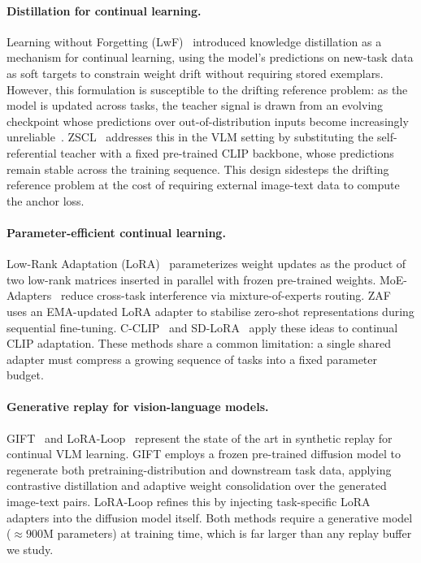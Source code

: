 \documentclass[10pt,twocolumn,letterpaper]{article}
\begin{document}
\paragraph{Distillation for continual learning.}
Learning without Forgetting (LwF)~\cite{li2017lwf} introduced knowledge distillation as a mechanism for continual learning, using the model's predictions on new-task data as soft targets to constrain weight drift without requiring stored exemplars. However, this formulation is susceptible to the drifting reference problem: as the model is updated across tasks, the teacher signal is drawn from an evolving checkpoint whose predictions over out-of-distribution inputs become increasingly unreliable~\cite{li2017lwf}. ZSCL~\cite{zheng2023zscl} addresses this in the VLM setting by substituting the self-referential teacher with a fixed pre-trained CLIP backbone, whose predictions remain stable across the training sequence. This design sidesteps the drifting reference problem at the cost of requiring external image-text data to compute the anchor loss.

\paragraph{Parameter-efficient continual learning.}
Low-Rank Adaptation (LoRA)~\cite{hu2022lora} parameterizes weight updates as the product of two low-rank matrices inserted in parallel with frozen pre-trained weights. MoE-Adapters~\cite{yu2024moe} reduce cross-task interference via mixture-of-experts routing. ZAF~\cite{gao2024zaf} uses an EMA-updated LoRA adapter to stabilise zero-shot representations during sequential fine-tuning. C-CLIP~\cite{liu2025cclip} and SD-LoRA~\cite{wu2025sdlora} apply these ideas to continual CLIP adaptation. These methods share a common limitation: a single shared adapter must compress a growing sequence of tasks into a fixed parameter budget.

\paragraph{Generative replay for vision-language models.}
GIFT~\cite{gift2025} and LoRA-Loop~\cite{loraloop2025} represent the state of the art in synthetic replay for continual VLM learning. GIFT employs a frozen pre-trained diffusion model to regenerate both pretraining-distribution and downstream task data, applying contrastive distillation and adaptive weight consolidation over the generated image-text pairs. LoRA-Loop refines this by injecting task-specific LoRA adapters into the diffusion model itself. Both methods require a generative model (${\approx}900$M parameters) at training time, which is far larger than any replay buffer we study.
\end{document}
